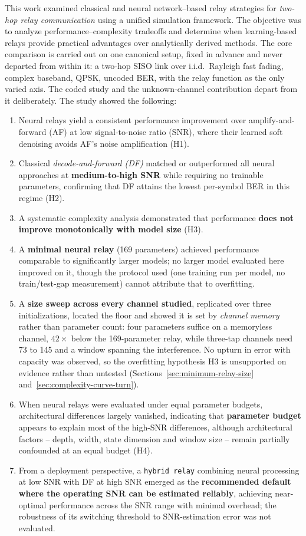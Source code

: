 This work examined classical and neural network–based relay strategies for \textit{two-hop relay communication} using a unified simulation framework. The objective was to analyze performance–complexity tradeoffs and determine when learning-based relays provide practical advantages over analytically derived methods.
The core comparison is carried out on one canonical setup, fixed in advance and never departed from within it: a two-hop SISO link over i.i.d.\ Rayleigh fast fading, complex baseband, QPSK, uncoded BER, with the relay function as the only varied axis. The coded study and the unknown-channel contribution depart from it deliberately. The study showed the following:
\begin{enumerate}
    \item Neural relays yield a consistent performance improvement over amplify-and-forward (AF) at low signal-to-noise ratio (SNR), where their learned soft denoising avoids AF's noise amplification (H1).
    \item Classical \textit{decode-and-forward (DF)} matched or outperformed all neural approaches at \textbf{medium-to-high SNR} while requiring no trainable parameters, confirming that DF attains the lowest per-symbol BER in this regime (H2).
    \item A systematic complexity analysis demonstrated that performance \textbf{does not improve monotonically with model size} (H3).
    \item A \textbf{minimal neural relay} (169 parameters) achieved performance comparable to significantly larger models; no larger model evaluated here improved on it, though the protocol used (one training run per model, no train/test-gap measurement) cannot attribute that to overfitting.
    \item A \textbf{size sweep across every channel studied}, replicated over three initializations, located the floor and showed it is set by \emph{channel memory} rather than parameter count: four parameters suffice on a memoryless channel, $42\times$ below the 169-parameter relay, while three-tap channels need 73 to 145 and a window spanning the interference. No upturn in error with capacity was observed, so the overfitting hypothesis H3 is unsupported on evidence rather than untested (Sections~\ref{sec:minimum-relay-size} and~\ref{sec:complexity-curve-turn}).
    \item When neural relays were evaluated under equal parameter budgets, architectural differences largely vanished, indicating that \textbf{parameter budget} appears to explain most of the high-SNR differences, although architectural factors -- depth, width, state dimension and window size -- remain partially confounded at an equal budget (H4).
    \item From a deployment perspective, a \texttt{hybrid relay} combining neural processing at low SNR with DF at high SNR emerged as the \textbf{recommended default where the operating SNR can be estimated reliably}, achieving near-optimal performance across the SNR range with minimal overhead; the robustness of its switching threshold to SNR-estimation error was not evaluated.
\end{enumerate}    
